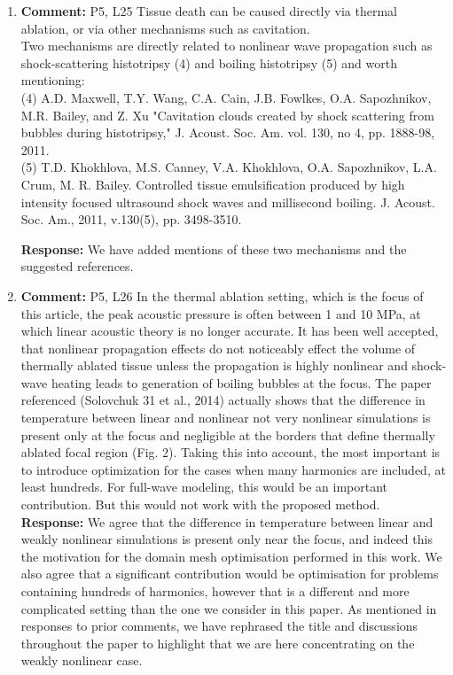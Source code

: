 \documentclass[11pt]{article}
\begin{document}
\begin{enumerate}
	\item \textbf{Comment:} P5, L25 Tissue death can be caused directly via thermal  ablation, or via other mechanisms such as cavitation.\\
	Two mechanisms are directly related to nonlinear wave propagation such as shock-scattering histotripsy (4) and boiling histotripsy (5) and worth mentioning: \\
	(4) A.D. Maxwell, T.Y. Wang, C.A. Cain, J.B. Fowlkes, O.A. Sapozhnikov, M.R. Bailey, and Z. Xu "Cavitation
	clouds created by shock scattering from bubbles during histotripsy," J. Acoust. Soc. Am. vol. 130, no 4, pp. 1888-98, 2011.\\
	(5) T.D. Khokhlova, M.S. Canney, V.A. Khokhlova, O.A. Sapozhnikov, L.A. Crum, M. R. Bailey. Controlled tissue emulsification produced by high intensity focused ultrasound shock waves and millisecond boiling. J. Acoust. Soc. Am., 2011, v.130(5), pp. 3498-3510.	
	
	\textbf{Response:} We have added mentions of these two mechanisms and the suggested references.
		
	\item \textbf{Comment:} P5, L26 In the thermal ablation setting, which is the focus of this article, the peak acoustic pressure is often between 1 and 10 MPa, at which linear acoustic theory is no longer accurate.
	It has been well accepted, that nonlinear propagation effects do not noticeably effect the volume of thermally ablated tissue unless the propagation is highly nonlinear and shock-wave heating leads to generation of boiling bubbles at the focus. The paper referenced (Solovchuk 31 et al., 2014) actually shows that the difference in temperature between linear and nonlinear not very nonlinear simulations is present only at the focus and negligible at the borders that define thermally ablated focal region (Fig. 2). Taking this into account, the most important is to introduce optimization for the cases when many harmonics are included, at least hundreds. For full-wave modeling, this would be an important contribution. But this would not work with the proposed method. \\
	\textbf{Response:} We agree that the difference in temperature between linear and 
	weakly nonlinear simulations is present only near the focus, and indeed this the motivation for the domain mesh 
	optimisation performed in this work. We also agree that a significant contribution would 
	be optimisation for problems containing hundreds of harmonics, however that is a 
	different and more complicated setting than the one we consider in this paper. As mentioned in responses to 
	prior comments, we have rephrased the title and discussions throughout the paper to highlight that we are 
	here concentrating on the weakly nonlinear case. 
	

\end{enumerate}
\end{document}
